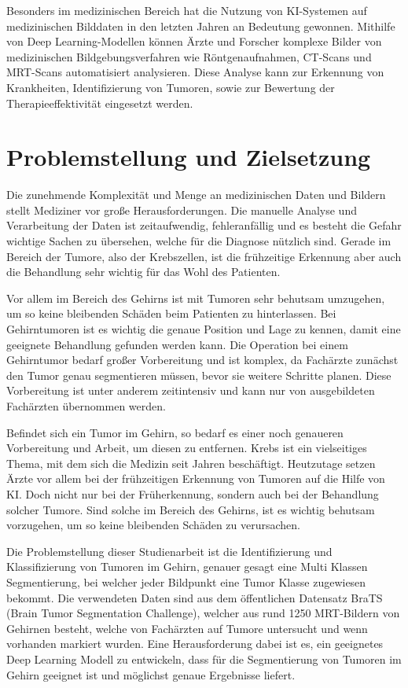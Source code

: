 Besonders im medizinischen Bereich hat die Nutzung von \ac{KI}-Systemen auf medizinischen Bilddaten in den letzten Jahren an Bedeutung gewonnen. Mithilfe von Deep Learning-Modellen können Ärzte und Forscher komplexe Bilder von medizinischen Bildgebungsverfahren wie Röntgenaufnahmen, CT-Scans und MRT-Scans automatisiert analysieren. Diese Analyse kann zur Erkennung von Krankheiten, Identifizierung von Tumoren, sowie zur Bewertung der Therapieeffektivität eingesetzt werden. 


\section{Problemstellung und Zielsetzung}
Die zunehmende Komplexität und Menge an medizinischen Daten und Bildern stellt Mediziner vor große Herausforderungen. Die manuelle Analyse und Verarbeitung der Daten ist zeitaufwendig, fehleranfällig und es besteht die Gefahr wichtige Sachen zu übersehen, welche für die Diagnose nützlich sind.
Gerade im Bereich der Tumore, also der Krebszellen, ist die frühzeitige Erkennung aber auch die Behandlung sehr wichtig für das Wohl des Patienten. 

Vor allem im Bereich des Gehirns ist mit Tumoren sehr behutsam umzugehen, um so keine bleibenden Schäden beim Patienten zu hinterlassen. Bei Gehirntumoren ist es wichtig die genaue Position und Lage zu kennen, damit eine geeignete Behandlung gefunden werden kann. Die Operation bei einem Gehirntumor bedarf großer Vorbereitung und ist komplex, da Fachärzte zunächst den Tumor genau segmentieren müssen, bevor sie weitere Schritte planen. Diese Vorbereitung ist unter anderem zeitintensiv und kann nur von ausgebildeten Fachärzten übernommen werden. 

Befindet sich ein Tumor im Gehirn, so bedarf es einer noch genaueren Vorbereitung und Arbeit, um diesen zu entfernen. 
Krebs ist ein vielseitiges Thema, mit dem sich die Medizin seit Jahren beschäftigt. Heutzutage setzen Ärzte vor allem bei der frühzeitigen Erkennung von Tumoren auf die Hilfe von \ac{KI}. Doch nicht nur bei der Früherkennung, sondern auch bei der Behandlung solcher Tumore. Sind solche im Bereich des Gehirns, ist es wichtig behutsam vorzugehen, um so keine bleibenden Schäden zu verursachen.

Die Problemstellung dieser Studienarbeit ist die Identifizierung und Klassifizierung von Tumoren im Gehirn, genauer gesagt eine Multi Klassen Segmentierung, bei welcher jeder Bildpunkt eine Tumor Klasse zugewiesen bekommt. Die verwendeten Daten sind aus dem öffentlichen Datensatz BraTS (Brain Tumor Segmentation Challenge), welcher aus rund 1250 \ac{MRT}-Bildern von Gehirnen besteht, welche von Fachärzten auf Tumore untersucht und wenn vorhanden markiert wurden. Eine Herausforderung dabei ist es, ein geeignetes Deep Learning \gls{Modell} zu entwickeln, dass für die Segmentierung von Tumoren im Gehirn geeignet ist und möglichst genaue Ergebnisse liefert.  

